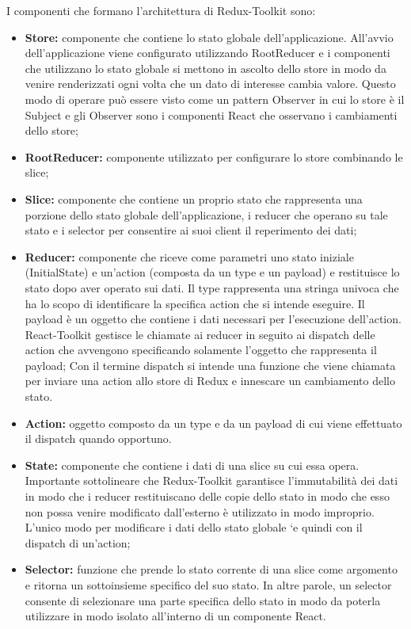 I componenti che formano l’architettura di Redux-Toolkit sono:
\begin{itemize}
    \item \textbf{Store:} componente che contiene lo stato globale dell’applicazione.
    All’avvio dell’applicazione viene configurato utilizzando RootReducer e i componenti che utilizzano
    lo stato globale si mettono in ascolto dello store in modo da venire renderizzati ogni volta che un dato
    di interesse cambia valore. Questo modo di operare può essere visto come un pattern Observer in
    cui lo store è il Subject e gli Observer sono i componenti React che osservano i cambiamenti dello store;
    \item \textbf{RootReducer:} componente utilizzato per configurare lo store combinando le slice;
    \item \textbf{Slice:} componente che contiene un proprio stato che rappresenta una porzione dello stato globale
    dell’applicazione, i reducer che operano su tale stato e i selector per consentire ai suoi client il
    reperimento dei dati;
    \item \textbf{Reducer:} componente che riceve come parametri uno stato iniziale (InitialState) e un'action
    (composta da un type e un payload) e restituisce lo stato dopo aver operato sui dati. 
    Il type rappresenta una stringa univoca che ha lo scopo di identificare la specifica action che si intende eseguire.
    Il payload è un oggetto che contiene i dati necessari per l'esecuzione dell'action.
    React-Toolkit gestisce le chiamate ai reducer in seguito ai dispatch delle action che avvengono
    specificando solamente l’oggetto che rappresenta il payload;
    Con il termine dispatch si intende una funzione che viene chiamata per inviare una action allo store di Redux e innescare un cambiamento dello stato.
    \item \textbf{Action:} oggetto composto da un type e da un payload di cui viene effettuato il dispatch quando
    opportuno.
    \item \textbf{State:} componente che contiene i dati di una slice su cui essa opera.
    Importante sottolineare che Redux-Toolkit garantisce l’immutabilità dei dati in modo che i reducer restituiscano delle copie dello stato in modo che esso non possa venire
    modificato dall’esterno è utilizzato in modo improprio.
    L’unico modo per modificare i dati dello stato globale `e quindi con il dispatch di un’action;
    \item \textbf{Selector:} funzione che prende lo stato corrente di una slice come argomento e ritorna un sottoinsieme
    specifico del suo stato. In altre parole, un selector consente di selezionare una parte specifica
    dello stato in modo da poterla utilizzare in modo isolato all’interno di un componente React.
\end{itemize}

